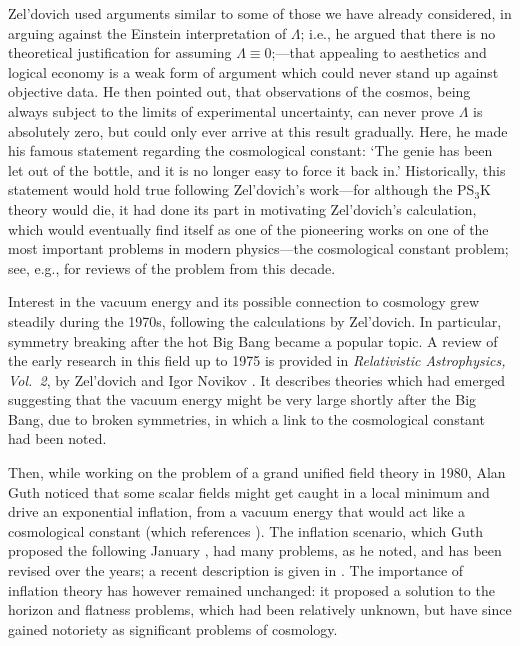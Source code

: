 Zel'dovich \cite{Zeldovich1968,Zeldovich2008} used arguments similar to some of those we have already considered, in arguing against the Einstein interpretation of $\Lambda$; i.e., he argued that there is no theoretical justification for assuming $\Lambda\equiv0$;---that appealing to aesthetics and logical economy is a weak form of argument which could never stand up against objective data. He then pointed out, that observations of the cosmos, being always subject to the limits of experimental uncertainty, can never prove $\Lambda$ is absolutely zero, but could only ever arrive at this result gradually. Here, he made his famous statement regarding the cosmological constant: `The genie has been let out of the bottle, and it is no longer easy to force it back in.' Historically, this statement would hold true following Zel'dovich's work---for although the PS$_3$K theory would die, it had done its part in motivating Zel'dovich's calculation, which would eventually find itself as one of the pioneering works on one of the most important problems in modern physics---the cosmological constant problem; see, e.g., \cite{Rugh2002,Padmanabhan2003} for reviews of the problem from this decade. 

Interest in the vacuum energy and its possible connection to cosmology grew steadily during the 1970s, following the calculations by Zel'dovich. In particular, symmetry breaking after the hot Big Bang became a popular topic. A review of the early research in this field up to 1975 is provided in \textit{Relativistic Astrophysics, Vol.~2}, by Zel'dovich and Igor Novikov \cite{Zeldovich1983}. It describes theories which had emerged suggesting that the vacuum energy might be very large shortly after the Big Bang, due to broken symmetries, in which a link to the cosmological constant had been noted. 

Then, while working on the problem of a grand unified field theory in 1980, Alan Guth noticed that some scalar fields might get caught in a local minimum and drive an exponential inflation, from a vacuum energy that would act like a cosmological constant \cite{Weinberg2008} (which references \cite{Guth1997}). The inflation scenario, which Guth proposed the following January \cite{Guth1981}, had many problems, as he noted, and has been revised over the years; a recent description is given in \cite{Weinberg2008}. The importance of inflation theory has however remained unchanged: it proposed a solution to the horizon and flatness problems, which had been relatively unknown, but have since gained notoriety as significant problems of cosmology. 

